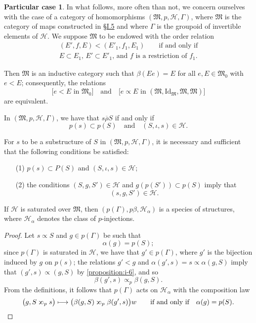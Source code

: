 \documentclass[a4paper,fleqn]{article}
\theoremstyle{plain}
\newenvironment{proposition}[1]
  {\renewcommand\theinnerproposition{#1}\innerproposition}
  {\endinnerproposition}
\theoremstyle{definition}
\newtheorem*{particular}{Particular case}
\newcommand{\oldpage}[1]{{\marginpar{\footnotesize$\bigg\vert$\,\,\,\,\textit{p.~#1}}}}
\newcommand{\textand}{\quad\text{and}\quad}
\newcommand{\HH}{\mathcal{H}}
\newcommand{\MM}{\mathfrak{M}}
\newcommand{\relrhobar}{\mathrel{\overline{\rho}}}
\newcommand{\subs}{\mathrel{\propto}}
\newcommand{\sups}{\mathrel{\reflectbox{$\propto$}}}
\newcommand{\Id}{\mathrm{Id}}
\begin{document}
\begin{particular}
  In what follows, more often than not, we concern ourselves with the case of a category of homomorphisms $(\MM,p,\HH,\Gamma)$, where $\MM$ is the category of maps constructed in \hyperref[section:i.5]{§I.5} and where $\Gamma$ is the groupoid of invertible elements of $\HH$.
  We suppose $\MM$ to be endowed with the order relation
  \[
    \begin{gathered}
      (E',f,E) < (E'_1,f_1,E_1)
      \qquad\text{if and only if}
    \\\text{$E\subset E_1$, $E'\subset E'_1$, and $f$ is a restriction of $f_1$.}
    \end{gathered}
  \]

  Then $\MM$ is an inductive category such that $\beta(Ee)=E$ for all $e,E\in\MM_0$ with $e<E$;
  consequently, the relations
  \[
    \big[\text{$e<E$ in $\MM_0$}\big]
    \textand
    \big[\text{$e\subs E$ in $(\MM,\Id_\MM,\MM,\MM)$}\big]
  \]
  are equivalent.

  In $(\MM,p,\HH,\Gamma)$, we have that $s\relrhobar S$ if and only if
  \[
    p(s)\subset p(S)
    \textand
    (S,\iota,s)\in\HH.
  \]

  For $s$ to be a substructure of $S$ in $(\MM,p,\HH,\Gamma)$, it is necessary and sufficient that the following conditions be satisfied:
  \begin{enumerate}
    \item[\normalfont(1)]
      $p(s)\subset P(S)$ and $(S,\iota,s)\in\HH$;
    \item[\normalfont(2)]
      the conditions $(S,g,S')\in\HH$ and $g(p(S'))\subset p(S)$ imply that
      \[
        (s,g,S')\in\HH.
      \]
  \end{enumerate}
\end{particular}

\begin{proposition}{15}
  If $\HH$ is saturated over $\MM$, then $(p(\Gamma),p\beta,\HH_\alpha)$ is a species of structures, where $\HH_\alpha$ denotes the class of $p$-injections.
\end{proposition}

\begin{proof}
  Let $s\subs S$ and $g\in p(\Gamma)$ be such that
  \[
    \alpha(g)
    = p(S);
  \]
  since $p(\Gamma)$ is saturated in $\HH$, we have that $g'\in p(\Gamma)$, where $g'$ is the bijection induced by $g$ on $p(s)$;
  the relations $g'<g$ and $\alpha(g',s)=s\subs\alpha(g,S)$ imply that $(g',s)\subs(g,S)$ by \cref{proposition:i-6}, and so
  \[
    \beta(g',s)
    \subs_p \beta(g,S).
  \]
  \oldpage{380}
  From the definitions, it follows that $p(\Gamma)$ acts on $\HH_\alpha$ with the composition law
  \[
    \big(
      g, S\sups_p s
    \big)
    \longmapsto
    \big(
      \beta(g,S) \sups_p \beta(g',s)
    \big)w
    \qquad\text{if and only if}\quad
    \alpha(g)=p(S).
    \qedhere
  \]
\end{proof}
\end{document}

